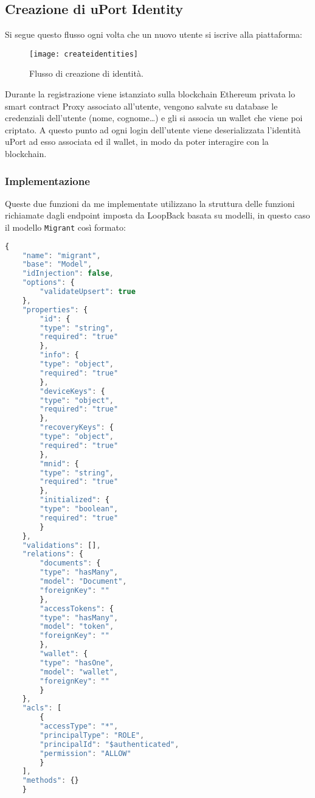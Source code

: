 \newpage

\subsection{Creazione di uPort Identity}

Si segue questo flusso ogni volta che un nuovo utente si iscrive alla piattaforma:

\begin{figure}[!ht]
    \texttt{[image: createidentities]}
    \caption{Flusso di creazione di identità.}
    \label{fig:createidentities}
\end{figure}

Durante la registrazione viene istanziato sulla blockchain Ethereum privata 
lo smart contract Proxy associato all’utente, vengono salvate su database le credenziali
dell’utente (nome, cognome…) e gli si associa un wallet che viene poi criptato. A questo punto
ad ogni login dell’utente viene deserializzata l’identità uPort
ad esso associata ed il wallet, in modo da poter interagire con la blockchain.

\subsubsection{Implementazione}

Queste due funzioni da me implementate utilizzano la struttura delle funzioni
richiamate dagli endpoint imposta da LoopBack basata su modelli, in questo caso
il modello \texttt{Migrant} così formato:

\begin{lstlisting}[language=JavaScript, numbers=none]
{
    "name": "migrant",
    "base": "Model",
    "idInjection": false,
    "options": {
        "validateUpsert": true
    },
    "properties": {
        "id": {
        "type": "string",
        "required": "true"
        },
        "info": {
        "type": "object",
        "required": "true"
        },
        "deviceKeys": {
        "type": "object",
        "required": "true"
        },
        "recoveryKeys": {
        "type": "object",
        "required": "true"
        },
        "mnid": {
        "type": "string",
        "required": "true"
        },
        "initialized": {
        "type": "boolean",
        "required": "true"
        }
    },
    "validations": [],
    "relations": {
        "documents": {
        "type": "hasMany",
        "model": "Document",
        "foreignKey": ""
        },
        "accessTokens": {
        "type": "hasMany",
        "model": "token",
        "foreignKey": ""
        },
        "wallet": {
        "type": "hasOne",
        "model": "wallet",
        "foreignKey": ""
        }
    },
    "acls": [
        {
        "accessType": "*",
        "principalType": "ROLE",
        "principalId": "$authenticated",
        "permission": "ALLOW"
        }
    ],
    "methods": {}
    }      
\end{lstlisting}

